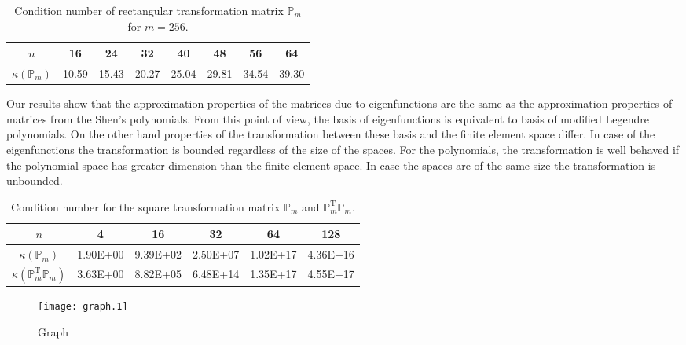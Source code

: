 \documentclass[a4paper,10pt]{article}
\newcommand{\Pmat}{\ensuremath{\mathbb{P}_m}}                  %
\newcommand{\Pmatt}{\ensuremath{\mathbb{P}_m^{\text{T}}}}       %
\begin{document}
  \begin{table}
    \begin{center}
    \begin{tabular}{|c||c|c|c|c|c|c|c|}
      \hline
      $n$           & 16 & 24 & 32 & 40 & 48 & 56 & 64\\
      \hline\hline
      $\kappa\left(\Pmat\right)$ & 10.59 & 15.43 & 20.27 & 25.04 & 29.81 & 34.54 & 39.30 \\
      \hline
    \end{tabular}
  \caption{Condition number of rectangular transformation matrix $\Pmat$ for
  $m=256$.}
  \label{tab:shen_Pm}
  \end{center}
  \end{table}
  Our results show that the approximation properties of the matrices due to
  eigenfunctions are the same as the approximation properties of matrices from
  the Shen's polynomials. From this point of view, the basis of eigenfunctions
  is equivalent to basis of modified Legendre polynomials. On the other hand
  properties of the transformation between these basis and the finite element
  space differ. In case of the eigenfunctions the transformation is bounded
  regardless of the size of the spaces. For the polynomials, the transformation
  is well behaved if the polynomial space has greater dimension than the finite
  element space. In case the spaces are of the same size the transformation is
  unbounded.
  \begin{table}
    \begin{center}
    \begin{tabular}{|c||c|c|c|c|c|}
      \hline
      $n$           &4& 16& 32& 64& 128 \\
      \hline\hline
      $\kappa(\Pmat)$ & 1.90E+00& 9.39E+02& 2.50E+07& 1.02E+17& 4.36E+16\\
      \hline
      $\kappa(\Pmatt\Pmat)$ & 3.63E+00& 8.82E+05& 6.48E+14& 1.35E+17& 4.55E+17\\
      \hline
    \end{tabular}
  \caption{Condition number for the square transformation matrix $\Pmat$ and
  $\Pmatt\Pmat$.}
  \label{tab:shen_P}
  \end{center}
  \end{table}
  \begin{figure}
    \begin{center}
      \texttt{[image: graph.1]}
    \caption{Graph}
    \label{fig:graph}
    \end{center}
  \end{figure}
  
\end{document}
